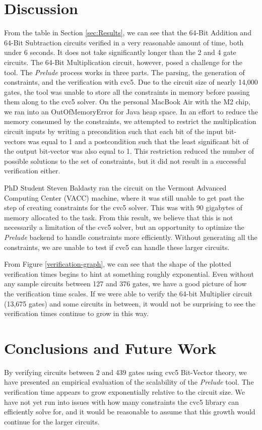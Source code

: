 \documentclass{article}
\begin{document}
\section{Discussion}
From the table in Section \ref{sec:Results}, we can see that the 64-Bit Addition and 64-Bit Subtraction circuits verified in a very reasonable amount of time, both under 6 seconds. It does not take significantly longer than the 2 and 4 gate circuits. The 64-Bit Multiplication circuit, however, posed a challenge for the tool. The \textit{Prelude} process works in three parts. The parsing, the generation of constraints, and the verification with cvc5. Due to the circuit size of nearly 14,000 gates, the tool was unable to store all the constraints in memory before passing them along to the cvc5 solver. On the personal MacBook Air with the M2 chip, we ran into an OutOfMemoryError for Java heap space. In an effort to reduce the memory consumed by the constraints, we attempted to restrict the multiplication circuit inputs by writing a precondition such that each bit of the input bit-vectors was equal to 1 and a postcondition such that the least significant bit of the output bit-vector was also equal to 1. This restriction reduced the number of possible solutions to the set of constraints, but it did not result in a successful verification either. 

PhD Student Steven Baldasty ran the circuit on the Vermont Advanced Computing Center (VACC) machine, where it was still unable to get past the step of creating constraints for the cvc5 solver. This was with 90 gigabytes of memory allocated to the task. From this result, we believe that this is not necessarily a limitation of the cvc5 solver, but an opportunity to optimize the \textit{Prelude} backend to handle constraints more efficiently. Without generating all the constraints, we are unable to test if cvc5 can handle these larger circuits.

From Figure \ref{verification-graph}, we can see that the shape of the plotted verification times begins to hint at something roughly exponential. Even without any sample circuits between 127 and 376 gates, we have a good picture of how the verification time scales. If we were able to verify the 64-bit Multiplier circuit (13,675 gates) and some circuits in between, it would not be surprising to see the verification times continue to grow in this way. 

\section{Conclusions and Future Work}
By verifying circuits between 2 and 439 gates using cvc5 Bit-Vector theory, we have presented an empirical evaluation of the scalability of the \textit{Prelude} tool. The verification time appears to grow exponentially relative to the circuit size. We have not yet run into issues with how many constraints the cvc5 library can efficiently solve for, and it would be reasonable to assume that this growth would continue for the larger circuits.
\end{document}
